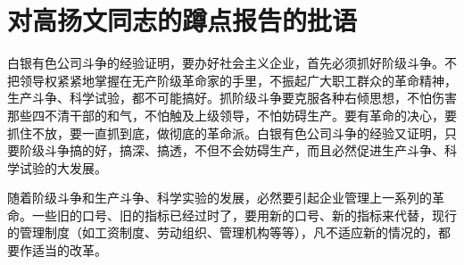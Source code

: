 \section[对高扬文同志的蹲点报告的批语（一九六四年十二月十九日）]{对高扬文同志的蹲点报告的批语}


白银有色公司斗争的经验证明，要办好社会主义企业，首先必须抓好阶级斗争。不把领导权紧紧地掌握在无产阶级革命家的手里，不振起广大职工群众的革命精神，生产斗争、科学试验，都不可能搞好。抓阶级斗争要克服各种右倾思想，不怕伤害那些四不清干部的和气，不怕触及上级领导，不怕妨碍生产。要有革命的决心，要抓住不放，要一直抓到底，做彻底的革命派。白银有色公司斗争的经验又证明，只要阶级斗争搞的好，搞深、搞透，不但不会妨碍生产，而且必然促进生产斗争、科学试验的大发展。

随着阶级斗争和生产斗争、科学实验的发展，必然要引起企业管理上一系列的革命。一些旧的口号、旧的指标已经过时了，要用新的口号、新的指标来代替，现行的管理制度（如工资制度、劳动组织、管理机构等等），凡不适应新的情况的，都要作适当的改革。

